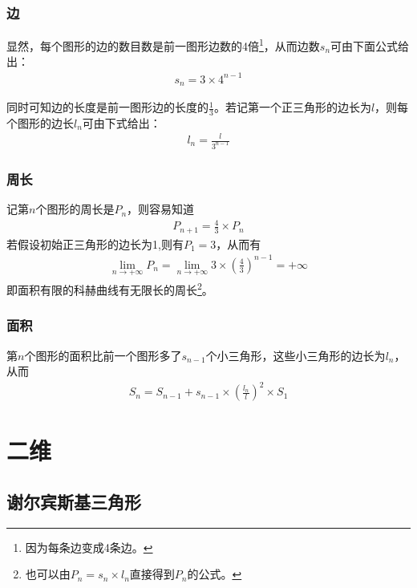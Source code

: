 \subsubsection{边}
\label{sec:koch-side}

显然，每个图形的边的数目数是前一图形边数的4倍\footnote{因为每条边变成4条边。}，从而边数$s_n$可由下面公式给出：
\begin{align*}
  s_n=3\times 4^{n-1}
\end{align*}

同时可知边的长度是前一图形边的长度的$\frac13$。若记第一个正三角形的边长为$l$，则每个图形的边长$l_n$可由下式给出：
\begin{align*}
  l_n=\frac{l}{3^{n-1}}
\end{align*}

\subsubsection{周长}
\label{sec:koch-perimeter}

记第$n$个图形的周长是$P_n$，则容易知道
\begin{align*}
  P_{n+1} = \frac43\times P_n
\end{align*}
若假设初始正三角形的边长为1,则有$P_1=3$，从而有
\begin{align*}
  \lim_{n\to+\infty}P_n = \lim_{n\to+\infty}3\times\left(\frac43\right)^{n-1}=+\infty
\end{align*}
即面积有限的科赫曲线有无限长的周长\footnote{也可以由$P_n=s_n\times l_n$直接得到$P_n$的公式。}。

\subsubsection{面积}
\label{sec:koch-area}

第$n$个图形的面积比前一个图形多了$s_{n-1}$个小三角形，这些小三角形的边长为$l_n$，从而
\begin{align*}
  S_n = S_{n-1} + s_{n-1} \times \left(\frac{l_n}{l}\right)^2 \times S_1
\end{align*}


\section{二维}
\label{sec:2D-fractal}

\subsection{谢尔宾斯基三角形}
\label{sec:sierpinski-triangle}


